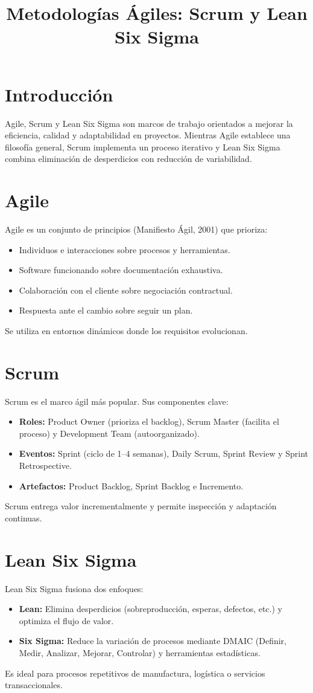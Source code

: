 \documentclass[12pt]{article}
\title{Metodologías Ágiles: Scrum y Lean Six Sigma}
\author{}
\date{}
\begin{document}
\maketitle

\section*{Introducción}
Agile, Scrum y Lean Six Sigma son marcos de trabajo orientados a mejorar la eficiencia, calidad y adaptabilidad en proyectos. Mientras Agile establece una filosofía general, Scrum implementa un proceso iterativo y Lean Six Sigma combina eliminación de desperdicios con reducción de variabilidad.

\section*{Agile}
Agile es un conjunto de principios (Manifiesto Ágil, 2001) que prioriza:
\begin{itemize}
    \item Individuos e interacciones sobre procesos y herramientas.
    \item Software funcionando sobre documentación exhaustiva.
    \item Colaboración con el cliente sobre negociación contractual.
    \item Respuesta ante el cambio sobre seguir un plan.
\end{itemize}
Se utiliza en entornos dinámicos donde los requisitos evolucionan.

\section*{Scrum}
Scrum es el marco ágil más popular. Sus componentes clave:
\begin{itemize}
    \item \textbf{Roles:} Product Owner (prioriza el backlog), Scrum Master (facilita el proceso) y Development Team (autoorganizado).
    \item \textbf{Eventos:} Sprint (ciclo de 1–4 semanas), Daily Scrum, Sprint Review y Sprint Retrospective.
    \item \textbf{Artefactos:} Product Backlog, Sprint Backlog e Incremento.
\end{itemize}
Scrum entrega valor incrementalmente y permite inspección y adaptación continuas.

\section*{Lean Six Sigma}
Lean Six Sigma fusiona dos enfoques:
\begin{itemize}
    \item \textbf{Lean:} Elimina desperdicios (sobreproducción, esperas, defectos, etc.) y optimiza el flujo de valor.
    \item \textbf{Six Sigma:} Reduce la variación de procesos mediante DMAIC (Definir, Medir, Analizar, Mejorar, Controlar) y herramientas estadísticas.
\end{itemize}
Es ideal para procesos repetitivos de manufactura, logística o servicios transaccionales.
\end{document}
